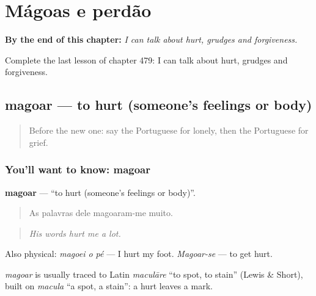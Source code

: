 
\chapter{Mágoas e perdão}
\label{ch:pt-magoas-e-perdao}

\begin{chapteropening}
\textbf{By the end of this chapter:} \emph{I can talk about hurt, grudges and forgiveness.}

Complete the last lesson of chapter 479: I can talk about hurt, grudges and forgiveness.
\end{chapteropening}

\section[magoar]{magoar — to hurt (someone's feelings or body)}

\label{lesson:PT-C479-magoar}



\begin{quote}
Before the new one: say the Portuguese for lonely, then the Portuguese for grief.
\end{quote}

\subsection*{You'll want to know: magoar}
\textbf{magoar} — \textquotedblleft{}to hurt (someone's feelings or body)\textquotedblright{}.

\begin{quote}
As palavras dele magoaram-me muito.
\end{quote}

\begin{quote}
\emph{His words hurt me a lot.}
\end{quote}

Also physical: \emph{magoei o pé} — I hurt my foot. \emph{Magoar-se} — to get hurt.

\begin{cousinweb}
\emph{magoar} is usually traced to Latin \emph{maculāre} \textquotedblleft{}to spot, to stain\textquotedblright{} (Lewis \& Short), built on \emph{macula} \textquotedblleft{}a spot, a stain\textquotedblright{}: a hurt leaves a mark.
\end{cousinweb}

